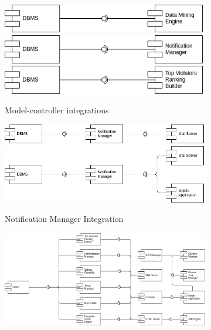 \documentclass{article}
\begin{document}
	\begin{figure}[h]
		\caption{Extended Features Integration}
		\begin{subfigure}[H]{.5\linewidth}
			\includegraphics[width=\linewidth]{images/integration_extended_1.png}
			\includegraphics[width=\linewidth]{images/integration_extended_2.png}
			\includegraphics[width=\linewidth]{images/integration_extended_3.png}
			\caption{Model-controller integrations}
		\end{subfigure}
		\begin{subfigure}[H]{.5\linewidth}
			\includegraphics[width=\linewidth]{images/integration_extended_7.png}
			\includegraphics[width=\linewidth]{images/integration_extended_5.png}
			\caption{Notification Manager Integration}
		\end{subfigure}
		\begin{subfigure}[H]{\linewidth}
			\centering
			\includegraphics[width=.49\linewidth]{images/integration_extended_4.png}

\end{subfigure}
\end{figure}
\end{document}
